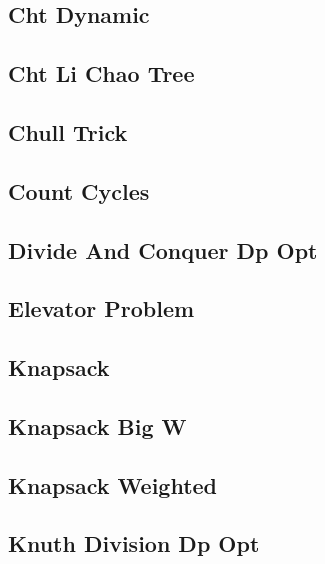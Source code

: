 \documentclass[10pt,landscape,twocolumn,a4paper,notitlepage]{article}
\newcommand\cppfile[2][]{

}
\begin{document}
\subsection{Cht Dynamic}
\cppfile{dp/CHT_Dynamic.cpp}

\subsection{Cht Li Chao Tree}
\cppfile{dp/CHT_Li_Chao_Tree.cpp}

\subsection{Chull Trick}
\cppfile{dp/CHull_Trick.cpp}

\subsection{Count Cycles}
\cppfile{dp/Count_Cycles.cpp}

\subsection{Divide And Conquer Dp Opt}
\cppfile{dp/divide_and_conquer_dp_opt.cpp}

\subsection{Elevator Problem}
\cppfile{dp/elevator_problem.cpp}

\subsection{Knapsack}
\cppfile{dp/knapsack.cpp}

\subsection{Knapsack Big W}
\cppfile{dp/knapsack_big_w.cpp}

\subsection{Knapsack Weighted}
\cppfile{dp/Knapsack_weighted.cpp}

\subsection{Knuth Division Dp Opt}
\cppfile{dp/knuth_division_dp_opt.cpp}
\end{document}
